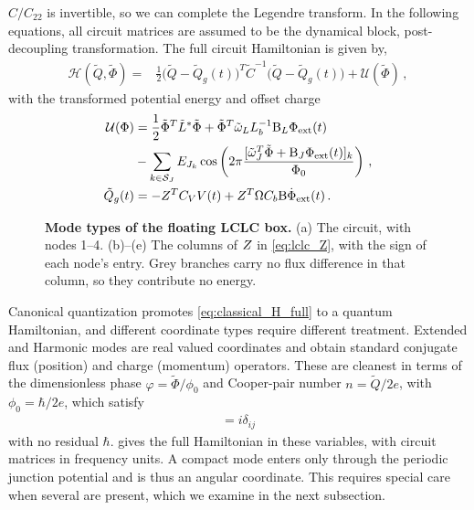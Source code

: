 $C/C_{22}$ is invertible, so we can complete the Legendre transform.
In the following equations, all circuit matrices are assumed to be the dynamical block, post-decoupling transformation.
The full circuit Hamiltonian is given by,
\begin{equation}
\begin{aligned}\label{eq:classical_H_full}
    \mathcal{H}(\tilde{Q}, \tilde{\Phi}) = &\frac{1}{2}\bigl(\tilde{Q}-\tilde{Q}_g(t)\bigr)^T \tilde{C}^{-1} \bigl(\tilde{Q}-\tilde{Q}_g(t)\bigr) + \mathcal{U}(\tilde \Phi)\,,
\end{aligned}
\end{equation}
with the transformed potential energy and offset charge
\begin{align}
    \mathcal{U}(\Phi) &= \frac{1}{2}\tilde{\Phi}^T \tilde{L}^* \tilde{\Phi} + \tilde{\Phi}^T \tilde{\omega}_{L} L_b^{-1} \mathrm{B}_L \Phi_{\rm ext}(t) \nonumber\\
    &- \sum_{k\in\mathcal{S}_J}E_{J_k}\cos\left(2\pi\frac{[\tilde{\omega}_{J}^T\tilde{\Phi} + \mathrm{B}_J\Phi_{\rm ext}(t)]_k}{\Phi_0}\right) \, , \\
    \tilde{Q}_g(t) &= -Z^T C_V V(t) + Z^T\Omega C_b \mathrm{B} \dot\Phi_{\rm ext}(t) \, .
    \label{eq:Q_g_tilde_expanded}
\end{align}

\begin{figure}[t]
    \centering
    
    \caption{{\bf Mode types of the floating LCLC box.}
    (a) The circuit, with nodes 1--4.
    (b)--(e) The columns of $Z$ in \cref{eq:lclc_Z}, with the sign of each node's entry.
    Grey branches carry no flux difference in that column, so they contribute no energy.}
    \label{fig:lclc_box}
\end{figure}

Canonical quantization promotes \cref{eq:classical_H_full} to a quantum Hamiltonian, and different coordinate types require different treatment.
Extended and Harmonic modes are real valued coordinates and obtain standard conjugate flux (position) and charge (momentum) operators.
These are cleanest in terms of the dimensionless phase $\varphi=\tilde\Phi/\phi_0$ and Cooper-pair number $n=\tilde Q/2e$, with $\phi_0=\hbar/2e$, which satisfy
\begin{align*}
    [\hat\varphi_i,\hat n_j]=i\delta_{ij}
\end{align*}
with no residual $\hbar$.
 gives the full Hamiltonian in these variables, with circuit matrices in frequency units.
A compact mode enters only through the periodic junction potential and is thus an angular coordinate.
This requires special care when several are present, which we examine in the next subsection.

